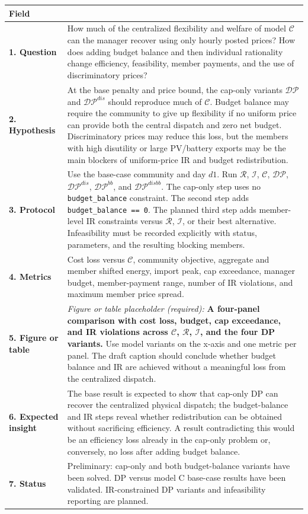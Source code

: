 \documentclass[]{article}
\begin{document}
\begin{longtable}[]{@{}
>{\raggedright\arraybackslash}p{}
>{\raggedright\arraybackslash}p{}@{}}
\toprule
Field & \\
\midrule
\endhead
\textbf{1. Question} &
How much of the centralized flexibility and welfare of model
\(\mathcal C\) can the manager recover using only hourly posted prices?
How does adding budget balance and then individual rationality change
efficiency, feasibility, member payments, and the use of discriminatory
prices? \\
\textbf{2. Hypothesis} &
At the base penalty and price bound, the cap-only variants
\(\mathcal{DP}\) and \(\mathcal{DP}^{dis}\) should reproduce much of
\(\mathcal C\). Budget balance may require the community to give up
flexibility if no uniform price can provide both the central dispatch and
zero net budget. Discriminatory prices may reduce this loss, but the
members with high disutility or large PV/battery exports may be the
main blockers of uniform-price IR and budget redistribution. \\
\textbf{3. Protocol} &
Use the base-case community and day \(d1\). Run
\(\mathcal R\), \(\mathcal I\), \(\mathcal C\),
\(\mathcal{DP}\), \(\mathcal{DP}^{dis}\),
\(\mathcal{DP}^{bb}\), and \(\mathcal{DP}^{disbb}\).
The cap-only step uses no \texttt{budget\_balance} constraint. The second
step adds \texttt{budget\_balance == 0}. The planned third step adds
member-level IR constraints versus \(\mathcal R\), \(\mathcal I\), or
their best alternative. Infeasibility must be recorded explicitly with
status, parameters, and the resulting blocking members. \\
\textbf{4. Metrics} &
Cost loss versus \(\mathcal C\), community objective, aggregate and
member shifted energy, import peak, cap exceedance, manager budget,
member-payment range, number of IR violations, and maximum member
price spread. \\
\textbf{5. Figure or table} &
\emph{Figure or table placeholder (required):}
\textbf{A four-panel comparison with cost loss, budget, cap exceedance,
and IR violations across \(\mathcal C\), \(\mathcal R\),
\(\mathcal I\), and the four DP variants.} Use model variants on the
x-axis and one metric per panel. The draft caption should conclude
whether budget balance and IR are achieved without a meaningful loss
from the centralized dispatch. \\
\textbf{6. Expected insight} &
The base result is expected to show that cap-only DP can recover the
centralized physical dispatch; the budget-balance and IR steps reveal
whether redistribution can be obtained without sacrificing efficiency.
A result contradicting this would be an efficiency loss already in the
cap-only problem or, conversely, no loss after adding budget balance. \\
\textbf{7. Status} &
Preliminary: cap-only and both budget-balance variants have been solved.
DP versus model C base-case results have been validated. IR-constrained
DP variants and infeasibility reporting are planned. \\
\bottomrule
\end{longtable}
\end{document}
